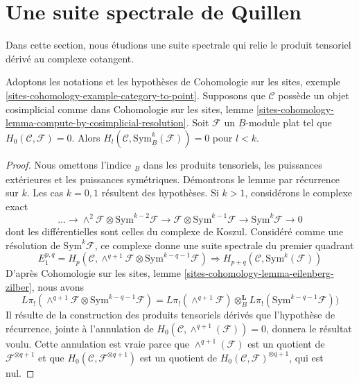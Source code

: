 \section{Une suite spectrale de Quillen}
\label{section-spectral-sequence}

\noindent
Dans cette section, nous étudions une suite spectrale qui relie le produit
tensoriel dérivé au complexe cotangent.

\begin{lemma}
\label{lemma-vanishing-symmetric-powers}
Adoptons les notations et les hypothèses de Cohomologie sur les sites, exemple
\ref{sites-cohomology-example-category-to-point}. Supposons que $\mathcal{C}$
possède un objet cosimplicial comme dans Cohomologie sur les sites, lemme
\ref{sites-cohomology-lemma-compute-by-cosimplicial-resolution}. Soit
$\mathcal{F}$ un $\underline{B}$-module plat tel que
$H_0(\mathcal{C}, \mathcal{F}) = 0$. Alors
$H_l(\mathcal{C}, \text{Sym}_{\underline{B}}^k(\mathcal{F})) = 0$ pour
$l < k$.
\end{lemma}

\begin{proof}
Nous omettons l'indice ${}_{\underline{B}}$ dans les produits tensoriels, les
puissances extérieures et les puissances symétriques. Démontrons le lemme par
récurrence sur $k$. Les cas $k = 0, 1$ résultent des hypothèses. Si $k > 1$,
considérons le complexe exact
$$
\ldots \to
\wedge^2\mathcal{F} \otimes \text{Sym}^{k - 2}\mathcal{F} \to
\mathcal{F} \otimes \text{Sym}^{k - 1}\mathcal{F} \to
\text{Sym}^k\mathcal{F} \to 0
$$
dont les différentielles sont celles du complexe de Koszul. Considéré comme
une résolution de $\text{Sym}^k\mathcal{F}$, ce complexe donne une suite
spectrale du premier quadrant
$$
E_1^{p, q} =
H_p(\mathcal{C},
\wedge^{q + 1}\mathcal{F} \otimes \text{Sym}^{k - q - 1}\mathcal{F})
\Rightarrow
H_{p + q}(\mathcal{C}, \text{Sym}^k(\mathcal{F}))
$$
D'après Cohomologie sur les sites, lemme
\ref{sites-cohomology-lemma-eilenberg-zilber}, nous avons
$$
L\pi_!(\wedge^{q + 1}\mathcal{F} \otimes \text{Sym}^{k - q - 1}\mathcal{F}) =
L\pi_!(\wedge^{q + 1}\mathcal{F}) \otimes_B^\mathbf{L}
L\pi_!(\text{Sym}^{k - q - 1}\mathcal{F}))
$$
Il résulte de la construction des produits tensoriels dérivés que l'hypothèse
de récurrence, jointe à l'annulation de
$H_0(\mathcal{C}, \wedge^{q + 1}(\mathcal{F})) = 0$, donnera le résultat voulu.
Cette annulation est vraie parce que $\wedge^{q + 1}(\mathcal{F})$ est un
quotient de $\mathcal{F}^{\otimes q + 1}$ et que
$H_0(\mathcal{C}, \mathcal{F}^{\otimes q + 1})$ est un quotient de
$H_0(\mathcal{C}, \mathcal{F})^{\otimes q + 1}$, qui est nul.
\end{proof}

